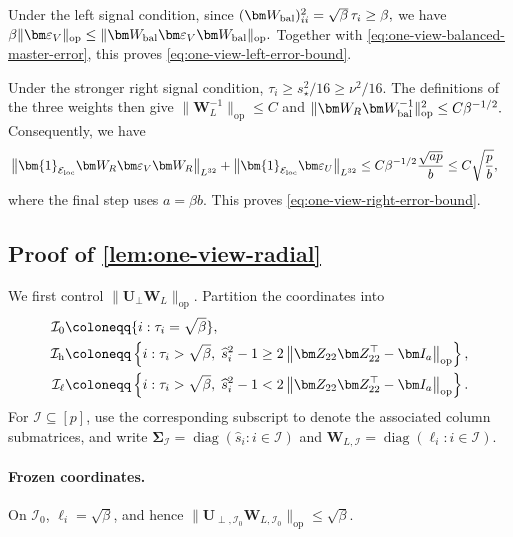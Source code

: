 \documentclass[11pt]{article}
\newcommand{\ind}{\bm{1}}
\newcommand{\trans}{\top}
\DeclareMathOperator{\diag}{diag}
\newcommand{\opn}[1]{\left\lVert #1\right\rVert_{\mathrm{op}}}
\newcommand{\Lqn}[2]{\left\lVert #1\right\rVert_{L^{#2}}}
\newcommand{\cE}{\mathcal{E}}
\newcommand{\cI}{\mathcal{I}}
\begin{document}
Under the left signal condition, since
$(\bm W_{\rm bal})_{ii}^2 = \sqrt\beta\,\tau_i \ge \beta,$
we have
$\beta\|\bm\varepsilon_V\|_{\mathrm{op}} \le \| \bm W_{\rm bal}\bm\varepsilon_V\bm W_{\rm bal} \|_{\mathrm{op}}.$
Together with \cref{eq:one-view-balanced-master-error}, this proves
\cref{eq:one-view-left-error-bound}.

Under the stronger right signal condition,
$\tau_i\ge s_\star^2/16\ge\nu^2/16$.  The definitions of the three weights
then give
\(\|\bm W_L^{-1}\|_{\mathrm{op}}\le C\) and
\(\|\bm W_R\bm W_{\rm bal}^{-1}\|_{\mathrm{op}}^2
\le C\beta^{-1/2}.\)
Consequently, we have
\[
\begin{aligned}
  &
  \Lqn{
    \ind_{\cE_{\rm loc}}
    \bm W_R\bm\varepsilon_V\bm W_R
  }{32}
  +
  \Lqn{
    \ind_{\cE_{\rm loc}}\bm\varepsilon_U
  }{32}\le
  C\beta^{-1/2}
  \frac{\sqrt{ap}}b
  \le
  C\sqrt{\frac pb},
\end{aligned}
\]
where the final step uses $a=\beta b$.
This proves \cref{eq:one-view-right-error-bound}.


\subsection{Proof of \cref{lem:one-view-radial}}
\label{app:proof-one-view-radial}

We first control $\|\bm U_\perp\bm W_L\|_{\mathrm{op}}$.
Partition the coordinates into
\begin{subequations}
\label{eq:one-view-radial-index-sets}
\begin{align}
  \cI_0
  &\coloneqq
  \{i:\tau_i=\sqrt\beta\},
  \\
  \cI_{\rm h}
  &\coloneqq
  \left\{
    i:\tau_i>\sqrt\beta,\;
    \widehat s_i^2-1
    \ge
    2\opn{\bm Z_{22}\bm Z_{22}^\trans-\bm I_a}
  \right\},
  \\
  \cI_{\rm \ell}
  &\coloneqq
  \left\{
    i:\tau_i>\sqrt\beta,\;
    \widehat s_i^2-1
    <
    2\opn{\bm Z_{22}\bm Z_{22}^\trans-\bm I_a}
  \right\}.
\end{align}
\end{subequations}
For $\cI\subseteq[p]$, use the corresponding subscript to denote the
associated column submatrices, and write
$\bm\Sigma_{\cI}=\diag(\widehat s_i:i\in\cI)$ and
$\bm W_{L,\cI}=\diag(\ell_i:i\in\cI)$.


\paragraph{Frozen coordinates.}
On $\cI_0$, $\ell_i=\sqrt\beta$, and hence
$\|\bm U_{\perp,\cI_0}\bm W_{L,\cI_0}\|_{\mathrm{op}}
\le\sqrt\beta$.
\end{document}
